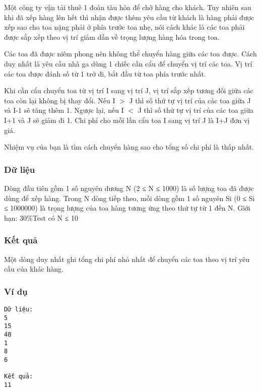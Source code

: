 



   Một công ty vận tải thuê 1 đoàn tàu hỏa để chở hàng cho khách. Tuy nhiên sau khi đã xếp hàng lên hết thì nhận được thêm yêu cầu từ khách là hàng phải được xếp sao cho toa nặng phải ở phía trước toa nhẹ, nói cách khác là các toa phải được sắp xếp theo vị trí giảm dần về trọng lượng hàng hóa trong toa.  

   Các toa đã được niêm phong nên không thể chuyển hàng giữa các toa được. Cách duy nhất là yêu cầu nhà ga dùng 1 chiếc cần cẩu để chuyển vị trí các toa. Vị trí các toa được đánh số từ 1 trở đi, bắt đầu từ toa phía trước nhất.  

   Khi cần cẩu chuyển toa từ vị trí I sang vị trí J, vị trí sắp xếp tương đối giữa các toa còn lại không bị thay đổi. Nếu I $>$ J thì số thứ tự vị trí của các toa giữa J và I-1 sẽ tăng thêm 1. Ngược lại, nếu I $<$ J thì số thứ tự vị trí của các toa giữa I+1 và J sẽ giảm đi 1. Chi phí cho mỗi lần cẩu toa I sang vị trí J là I+J đơn vị giá.  

   Nhiệm vụ của bạn là tìm cách chuyển hàng sao cho tổng số chi phí là thấp nhất.  

\subsubsection{   Dữ liệu  }

   Dòng đầu tiên gồm 1 số nguyên dương N (2 ≤ N ≤ 1000) là số lượng toa đã được dùng để xếp hàng.  Trong N dòng tiếp theo, mỗi dòng gồm 1 số nguyên Si (0 ≤ Si ≤ 1000000) là trọng lượng của toa hàng tương ứng theo thứ tự từ 1 đến N.    Giới hạn: 30\%Test có N ≤ 10  

\subsubsection{   Kết quả  }

   Một dòng duy nhất ghi tổng chi phí nhỏ nhất để chuyển các toa theo vị trí yêu cầu của khác hàng.  

\subsubsection{   Ví dụ  }
\begin{verbatim}
Dữ liệu:
5
15
40
1
8
6

Kết quả:
11

\end{verbatim}